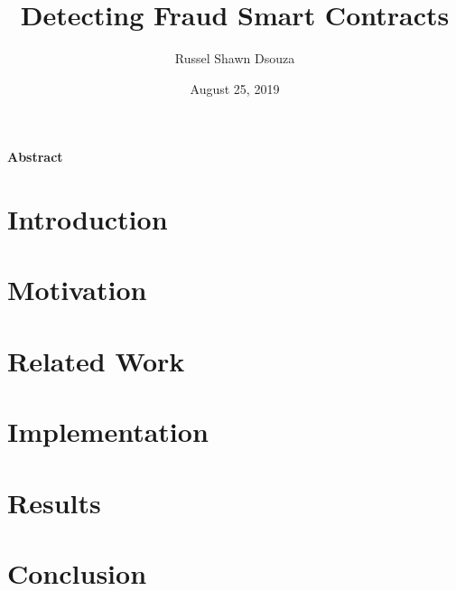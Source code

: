 \documentclass[11pt]{article}
\title{\textbf{Detecting Fraud Smart Contracts}}
\author{Russel Shawn Dsouza}
\date{August 25, 2019}
\theoremstyle{definition}
\begin{document}
  \maketitle

  \begin{center}
    \textbf{Abstract}
  \end{center}

  \section{Introduction}

  \section{Motivation}

  \section{Related Work}

  \section{Implementation}

  \section{Results}

  \section{Conclusion}
  
  
\end{document}

